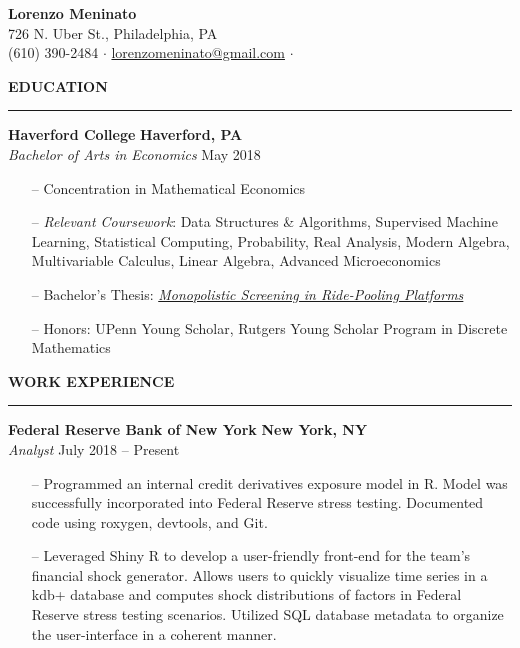 \documentclass[paper=a4, fontsize=11pt]{scrartcl} %
\newcommand{\I}{--}
\newenvironment{mycenter}[1][\topsep]
  {\setlength{\topsep}{#1}\par\kern\topsep\centering}%
  {\par\kern\topsep}%
\begin{document}
\begin{mycenter}
\textbf{\LARGE Lorenzo Meninato} \\
726 N. Uber St., Philadelphia, PA \\
(610) 390-2484 $\cdot$ \href{mailto:lorenzomeninato@gmail.com}{lorenzomeninato@gmail.com} $\cdot$ 

\end{mycenter}

\begin{mycenter}[0pt]
\textsc{\textbf{EDUCATION}}
\end{mycenter}

\vspace{-3mm}
\rule{\textwidth}{0.4pt}

\textbf{Haverford College} \hfill  \textbf{Haverford, PA} \\
\textit{Bachelor of Arts in Economics} \hfill May 2018

\begin{itemize}[topsep=0pt,noitemsep]
    \item[\I] Concentration in Mathematical Economics
	\item[\I] \textit{Relevant Coursework}: Data Structures \& Algorithms, Supervised Machine Learning, Statistical Computing, Probability, Real Analysis, Modern Algebra, Multivariable Calculus, Linear Algebra, Advanced Microeconomics
	\item[\I] Bachelor's Thesis: \textit{\href{https://github.com/lmeninato/ECON396/blob/master/Lorenzo\%20Meninato\%20Thesis.pdf}{Monopolistic Screening in Ride-Pooling Platforms}}
	\item[\I] Honors: UPenn Young Scholar, Rutgers Young Scholar Program in Discrete Mathematics
\end{itemize}

\vspace{2mm}

\begin{mycenter}[0pt]
\textsc{\textbf{WORK EXPERIENCE}}
\end{mycenter}

\vspace{-3mm}
\rule{\textwidth}{0.4pt}

\textbf{Federal Reserve Bank of New York} \hfill \textbf{New York, NY} \\
\textit{Analyst} \hfill July 2018 -- Present
\begin{itemize}[topsep=0pt,noitemsep]
	\item[\I] Programmed an internal credit derivatives exposure model in R. Model was successfully incorporated into Federal Reserve stress testing. Documented code using roxygen, devtools, and Git. 
	\item[\I] Leveraged Shiny R to develop a user-friendly front-end for the team's financial shock generator. Allows users to quickly visualize time series in a kdb+ database and computes shock distributions of factors in Federal Reserve stress testing scenarios. Utilized SQL database metadata to organize the user-interface in a coherent manner. 
\end{itemize}
\end{document}

